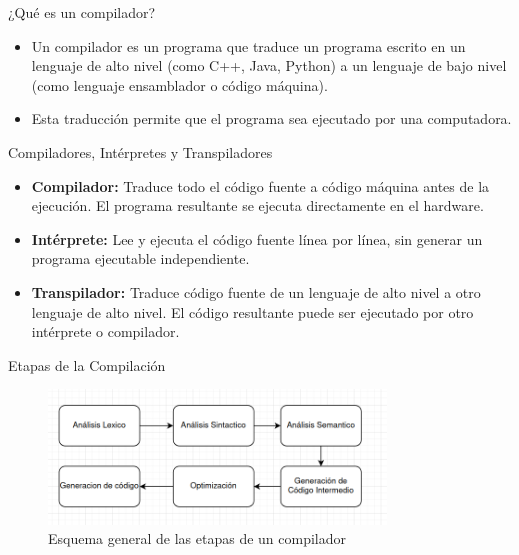 \documentclass{beamer}
\begin{document}
	
	\begin{frame}{¿Qué es un compilador?}
		
		\begin{itemize}
			\item Un compilador es un programa que traduce un programa escrito en un lenguaje de alto nivel (como C++, Java, Python) a un lenguaje de bajo nivel (como lenguaje ensamblador o código máquina).
			\item Esta traducción permite que el programa sea ejecutado por una computadora.
		\end{itemize}
		
	\end{frame}
	
	\begin{frame}{Compiladores, Intérpretes y Transpiladores}
		
		\begin{itemize}
			\item \textbf{Compilador:} Traduce todo el código fuente a código máquina antes de la ejecución. El programa resultante se ejecuta directamente en el hardware.
			\item \textbf{Intérprete:} Lee y ejecuta el código fuente línea por línea, sin generar un programa ejecutable independiente.
			\item \textbf{Transpilador:} Traduce código fuente de un lenguaje de alto nivel a otro lenguaje de alto nivel. El código resultante puede ser ejecutado por otro intérprete o compilador.
		\end{itemize}
		
	\end{frame}
	
	\begin{frame}{Etapas de la Compilación}
		
		\begin{figure}
			\includegraphics[width=0.8\textwidth]{diagrama_compilador.png} %
			\caption{Esquema general de las etapas de un compilador}
		\end{figure}
		
	\end{frame}
	
\end{document}
